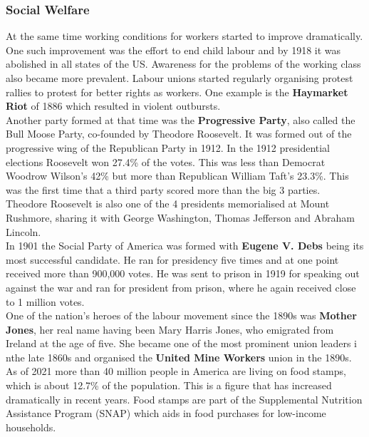 \documentclass{article}
\begin{document}
	\subsubsection{Social Welfare}
	At the same time working conditions for workers started to improve dramatically. One such improvement was the effort to end child labour and by 1918 it was abolished in all states of the US. Awareness for the problems of the working class also became more prevalent. Labour unions started regularly organising protest rallies to protest for better rights as workers. One example is the \textbf{Haymarket Riot} of 1886 which resulted in violent outbursts. \\
	Another party formed at that time was the \textbf{Progressive Party}, also called the Bull Moose Party, co-founded by Theodore Roosevelt. It was formed out of the progressive wing of the Republican Party in 1912. In the 1912 presidential elections Roosevelt won 27.4\% of the votes. This was less than Democrat Woodrow Wilson's 42\% but more than Republican William Taft's 23.3\%. This was the first time that a third party scored more than the big 3 parties. \\
	Theodore Roosevelt is also one of the 4 presidents memorialised at Mount Rushmore, sharing it with George Washington, Thomas Jefferson and Abraham Lincoln. \\
	In 1901 the Social Party of America was formed with \textbf{Eugene V. Debs} being its most successful candidate. He ran for presidency five times and at one point received more than 900,000 votes. He was sent to prison in 1919 for speaking out against the war and ran for president from prison, where he again received close to 1 million votes. \\
	One of the nation's heroes of the labour movement since the 1890s was \textbf{Mother Jones}, her real name having been Mary Harris Jones, who emigrated from Ireland at the age of five. She became one of the most prominent union leaders i nthe late 1860s and organised the \textbf{United Mine Workers} union in the 1890s. \\
	As of 2021 more than 40 million people in America are living on food stamps, which is about 12.7\% of the population. This is a figure that has increased dramatically in recent years. Food stamps are part of the Supplemental Nutrition Assistance Program (SNAP) which aids in food purchases for low-income households. \\
\end{document}
